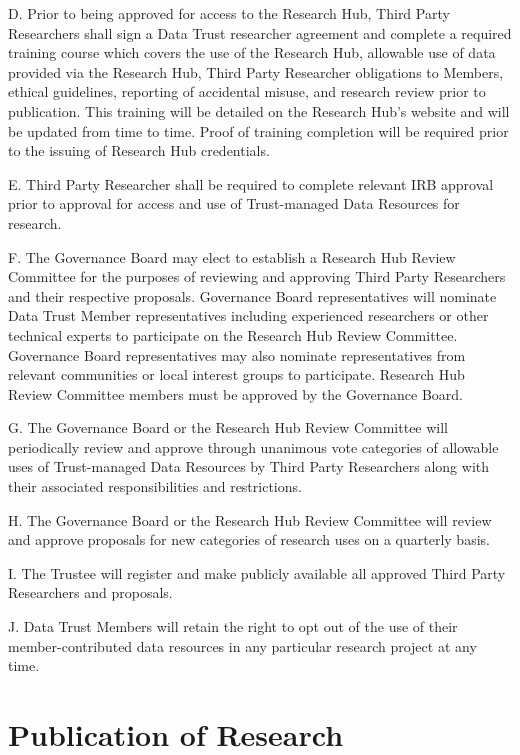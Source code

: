 \documentclass[]{book}
\begin{document}
D. Prior to being approved for access to the Research Hub, Third Party Researchers shall sign a Data Trust researcher agreement and complete a required training course which covers the use of the Research Hub, allowable use of data provided via the Research Hub, Third Party Researcher obligations to Members, ethical guidelines, reporting of accidental misuse, and research review prior to publication. This training will be detailed on the Research Hub's website and will be updated from time to time. Proof of training completion will be required prior to the issuing of Research Hub credentials.

E. Third Party Researcher shall be required to complete relevant IRB approval prior to approval for access and use of Trust-managed Data Resources for research.

F. The Governance Board may elect to establish a Research Hub Review Committee for the purposes of reviewing and approving Third Party Researchers and their respective proposals. Governance Board representatives will nominate Data Trust Member representatives including experienced researchers or other technical experts to participate on the Research Hub Review Committee. Governance Board representatives may also nominate representatives from relevant communities or local interest groups to participate. Research Hub Review Committee members must be approved by the Governance Board.

G. The Governance Board or the Research Hub Review Committee will periodically review and approve through unanimous vote categories of allowable uses of Trust-managed Data Resources by Third Party Researchers along with their associated responsibilities and restrictions.

H. The Governance Board or the Research Hub Review Committee will review and approve proposals for new categories of research uses on a quarterly basis.

I. The Trustee will register and make publicly available all approved Third Party Researchers and proposals.

J. Data Trust Members will retain the right to opt out of the use of their member-contributed data resources in any particular research project at any time.

\hypertarget{publication-of-research}{%
\chapter{Publication of Research}\label{publication-of-research}}
\end{document}
